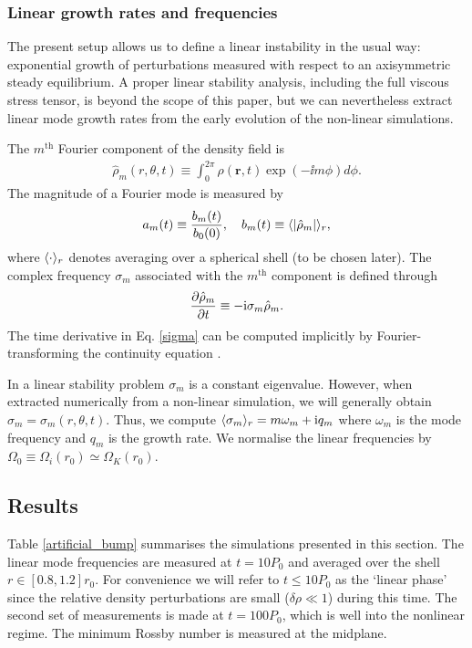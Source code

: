 \subsubsection{Linear growth rates and frequencies}
The present setup allows us to define a linear instability in the
usual way: exponential growth of perturbations measured with respect
to an axisymmetric steady equilibrium. A proper linear
stability analysis, including the full viscous stress tensor, is
beyond the scope of this paper, but we can nevertheless extract linear 
mode growth rates from the early evolution of the non-linear simulations.  

The $m^\mathrm{th}$ Fourier component of the density field is  
\begin{align}
\hat{\rho}_m(r,\theta,t) \equiv \int_0^{2\pi} \rho(\bm{r},t)\exp{(-\ii m\phi)}d\phi.
\end{align}
The magnitude of a Fourier mode is measured by 
\begin{align} 
a_m(t)\equiv \frac{b_m(t)}{b_0(0)},\quad b_m(t)\equiv \langle |\hat{\rho}_m| \rangle_r,
\end{align} 
where $\langle \cdot \rangle_r$ denotes averaging over a spherical shell (to be
chosen later). 
The complex frequency $\sigma_m$ associated with the $m^\mathrm{th}$ component 
is defined through 
\begin{align}\label{sigma}
  \frac{\partial\hat{\rho}_m}{\partial t} \equiv -\mathrm{i}\sigma_m\hat{\rho}_m. 
\end{align}
The time derivative in Eq. \ref{sigma} can be computed implicitly by 
Fourier-transforming the continuity equation \citep[as done
  in][]{lin13}. 

In a linear stability problem $\sigma_m$ is a constant eigenvalue. 
However, when extracted numerically from a non-linear simulation, 
we will generally obtain $\sigma_m=\sigma_m(r,\theta,t)$. Thus, we compute 
$\langle \sigma_m \rangle_r = m\omega_m + \mathrm{i} q_m$    
where $\omega_m$ is the mode frequency and $q_m$ is the growth rate.
We normalise the linear frequencies by
$\Omega_0\equiv\Omega_i(r_0)\simeq\Omega_K(r_0)$. 

\subsection{Results}
Table \ref{artificial_bump} summarises the simulations presented in
this section. %
 The linear mode frequencies are measured at 
$t=10P_0$ and averaged over the shell $r\in[0.8,1.2]r_0$.   
For convenience we will refer to $t\leq10P_0$ as the `linear
phase' since the relative density perturbations are
small ($\delta\rho\ll 1$) during this time.  
The second set of measurements is made at $t=100P_0$, which is well
into the nonlinear regime. %
The minimum Rossby number is measured at the midplane. 

